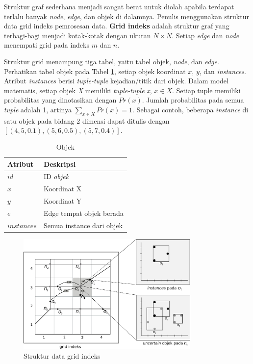 \documentclass[conference]{IEEEtran}
\begin{document}
Struktur graf sederhana menjadi sangat berat untuk diolah apabila terdapat terlalu banyak \textit{node}, \textit{edge}, dan objek di dalamnya. Penulis menggunakan struktur data grid indeks pemrosesan data. \textbf{Grid indeks} adalah struktur graf yang terbagi-bagi menjadi kotak-kotak dengan ukuran $ N \times N $. Setiap \textit{edge} dan \textit{node} menempati grid pada indeks $ m $ dan $ n $.

Struktur grid menampung tiga tabel, yaitu tabel objek, \textit{node}, dan \textit{edge}. Perhatikan tabel objek pada Tabel \ref{tab:objek}, setiap objek koordinat $ x $, $ y $, dan \textit{instances}. Atribut \textit{instances} berisi \textit{tuple-tuple} kejadian/titik dari objek. Dalam model matematis, setiap objek \textit{X} memiliki \textit{tuple-tuple} \textit{x}, $ x \in X $. Setiap tuple memiliki probabilitas yang dinotasikan dengan $ Pr(x) $. Jumlah probabilitas pada semua \textit{tuple} adalah 1, artinya $ \sum_{x \in X} Pr(x) = 1 $. Sebagai contoh, beberapa \textit{instance} di satu objek pada bidang 2 dimensi dapat ditulis dengan $ [(4, 5, 0.1), (5, 6, 0.5), (5, 7, 0.4)] $.

\begin{table}[htbp]
	\caption{Objek}
	\begin{center}
		\begin{tabular}{| p{2cm} | p{5cm} |}
			\hline
			\textbf{Atribut} & \textbf{Deskripsi} \\ \hline
			$ id $ & ID \textit{objek} \\ \hline
			$ x $ & Koordinat X \\ \hline
			$ y $ & Koordinat Y \\ \hline
			$ e $ & Edge tempat objek berada \\ \hline
			$ instances $ & Semua instance dari objek \\
			\hline
		\end{tabular}
		\label{tab:objek}
	\end{center}
\end{table}

\begin{figure}[H]
	\centering
	\includegraphics[width=9cm]{imgs/struktur-data.png}
	\caption{Struktur data grid indeks}
	\label{fig:grid}
\end{figure}
\end{document}

